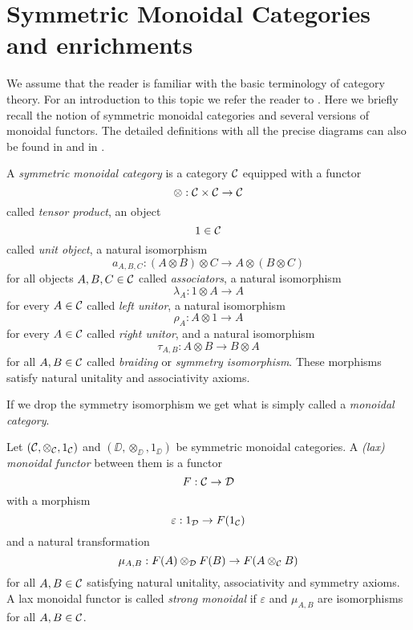 \documentclass[Thesis.tex]{subfiles}
\begin{document}
\section{Symmetric Monoidal Categories and enrichments}

We assume that the reader is familiar with the basic terminology of category theory. For an introduction to this topic we refer the reader to \cite{maclane}. Here we briefly recall the notion of symmetric monoidal categories and several versions of monoidal functors. The detailed definitions with all the precise diagrams can also be found in \cite{maclane} and in \cite{borceux}.

\begin{defin}
A \emph{symmetric monoidal category} is a category ${\mathcal C}$ equipped with a functor 
\[\otimes:{\mathcal C}\times{\mathcal C}\to{\mathcal C}\]
called \emph{tensor product}, an object
\[1\in{\mathcal C}\]
called \emph{unit object}, a natural isomorphism
\[a_{A,B,C} : (A \otimes B) \otimes C \to A \otimes (B \otimes C)\]
for all objects $A,B,C\in{\mathcal C}$ called \emph{associators}, a natural isomorphism
\[\lambda_A:1\otimes A\to A\]
for every $A\in{\mathcal C}$ called \emph{left unitor}, a natural isomorphism
\[\rho_A:A\otimes 1\to A\]
for every $A\in{\mathcal C}$ called \emph{right unitor}, and a natural isomorphism
\[\tau_{A,B}:A\otimes B \to B\otimes A\]
for all $A,B\in{\mathcal C}$ called \emph{braiding} or \emph{symmetry isomorphism}. These morphisms satisfy natural unitality and associativity axioms.
\end{defin}

\begin{remark}
If we drop the symmetry isomorphism we get what is simply called a \emph{monoidal category}.
\end{remark}

\begin{defin}
Let $({\mathcal C},\otimes_{\mathcal C}, 1_{\mathcal C})$ and $(\DD, \otimes_\DD, 1_\DD)$ be symmetric monoidal categories. A \emph{(lax) monoidal functor} between them is a functor
\[F:{\mathcal C}\to{\mathcal D}\]
with a morphism
\[\varepsilon:1_{\mathcal D}\to F(1_{\mathcal C})\]
and a natural transformation
\[\mu_{A,B}:F(A)\otimes_{\mathcal D}  F(B)\to F(A\otimes_{\mathcal C} B)\]
for all $A,B\in{\mathcal C}$ satisfying natural unitality, associativity and symmetry axioms. A lax monoidal functor is called \emph{strong monoidal} if $\varepsilon$ and $\mu_{A,B}$ are isomorphisms for all $A,B\in{\mathcal C}$.
\end{defin}
\end{document}
